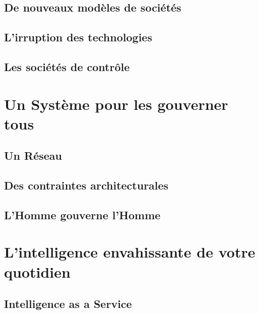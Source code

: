 \documentclass{report}
\begin{document}
    \section{De nouveaux modèles de sociétés}
    \section{L'irruption des technologies}
    \section{Les sociétés de contrôle}

\chapter{Un Système pour les gouverner tous}
    \section{Un Réseau}
    \section{Des contraintes architecturales}
    \section{L'Homme gouverne l'Homme}

\chapter{L'intelligence envahissante de votre quotidien}
    \section{Intelligence as a Service}
\end{document}
